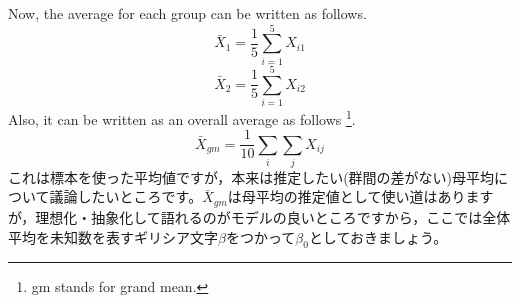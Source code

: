 \documentclass{ltjbook}
\begin{document}




Now, the average for each group can be written as follows.
\[ \bar{X}_1 =\frac{1}{5} \sum_{i=1}^5 X_{i1} \]
\[ \bar{X}_2 =\frac{1}{5} \sum_{i=1}^5 X_{i2} \]
Also, it can be written as an overall average as follows \footnote{gm stands for grand mean.}.
\[ \bar{X}_{gm} = \frac{1}{10} \sum_{i} \sum_{j} X_{ij} \]
これは標本を使った平均値ですが，本来は推定したい(群間の差がない)母平均について議論したいところです。$\bar{X}_{gm}$は母平均の推定値として使い道はありますが，理想化・抽象化して語れるのがモデルの良いところですから，ここでは全体平均を未知数を表すギリシア文字$\beta$をつかって$\beta_0$としておきましょう。
\end{document}
